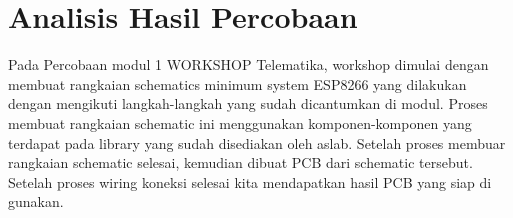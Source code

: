 \section*{Analisis Hasil Percobaan}
\indent
Pada Percobaan modul 1 WORKSHOP Telematika, workshop dimulai dengan membuat rangkaian schematics minimum system ESP8266 yang dilakukan dengan mengikuti langkah-langkah yang sudah dicantumkan di modul. Proses membuat rangkaian schematic ini menggunakan komponen-komponen yang terdapat pada library yang sudah disediakan oleh aslab. Setelah proses membuar rangkaian schematic selesai, kemudian dibuat PCB dari schematic tersebut. Setelah proses wiring koneksi selesai kita mendapatkan hasil PCB yang siap di gunakan.

